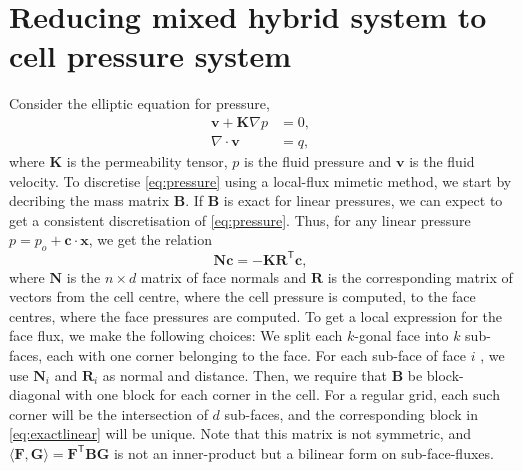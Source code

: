\documentclass[11pt,fleqn]{amsart}
\newcommand{\vect}[1]{\boldsymbol{#1}}
\newcommand{\mat}[1]{\boldsymbol{#1}}
\newcommand{\transp}[1]{{#1}^{\ensuremath{\mathsf{T}}}}
\begin{document}
\section{Reducing mixed hybrid system to cell pressure system}
Consider the elliptic equation for pressure, 
\begin{align}
  \label{eq:pressure}
  \vect{v} + \mat{K}\nabla p  &=  0,\\
  \nabla\cdot\vect{v}        &= q,
\end{align}
where $\mat{K}$ is the permeability tensor, $p$ is the fluid pressure
and $\vect{v}$ is the fluid velocity.  To discretise
\eqref{eq:pressure} using a local-flux mimetic method, we start by
decribing the mass matrix $\mat{B}$.  If $\mat{B}$ is exact for linear
pressures, we can expect to get a consistent discretisation of
\eqref{eq:pressure}.  Thus, for any linear pressure $p = p_o +
\vect{c}\cdot\vect{x}$, we get the relation
\begin{equation}
  \label{ep:exactlinear}
  \mat{N}\vect{c} = -\mat{K}\transp{\mat{R}}\vect{c},
\end{equation}
where $\mat{N}$ is the $n\times d$ matrix of face normals and
$\mat{R}$ is the corresponding matrix of vectors from the cell centre,
where the cell pressure is computed, to the face centres, where the
face pressures are computed.  To get a local expression for the face
flux, we make the following choices: We split each $k$-gonal face into
$k$ sub-faces, each with one corner belonging to the face.  For each
sub-face of face $i$ , we use $\mat{N}_i$ and $\mat{R}_i$ as normal
and distance. Then, we require that $\mat{B}$ be block-diagonal with
one block for each corner in the cell.  For a regular grid, each such
corner will be the intersection of $d$ sub-faces, and the
corresponding block in \eqref{eq:exactlinear} will be unique.  Note
that this matrix is not symmetric, and $\langle\vect{F},\vect{G}\rangle =
\transp{\vect{F}}\mat{B}\vect{G}$ is not an inner-product but a
bilinear form on sub-face-fluxes.
\end{document}

